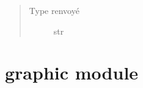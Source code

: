 \documentclass[letterpaper,10pt,french]{sphinxmanual}
\begin{document}
\begin{fulllineitems}
\begin{fulllineitems}
\begin{quote}
\begin{description}
\item[{Type renvoyé}] \leavevmode
str

\end{description}\end{quote}

\end{fulllineitems}


\end{fulllineitems}



\section{graphic module}
\label{\detokenize{graphic:module-graphic}}\label{\detokenize{graphic:graphic-module}}\label{\detokenize{graphic::doc}}\label{\detokenize{graphic:module-graphic}}
\end{document}
